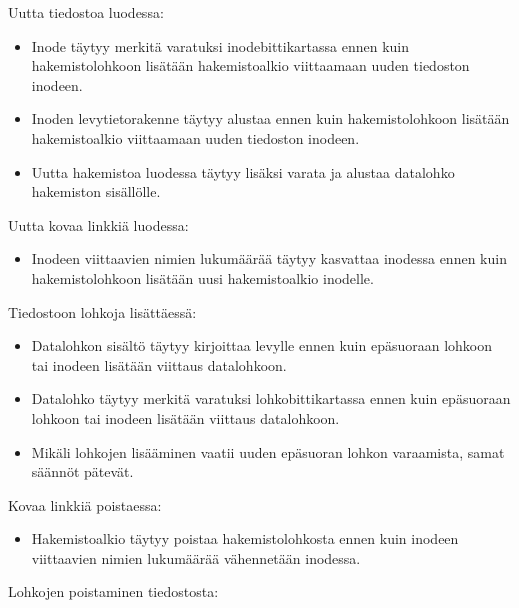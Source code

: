 
Uutta tiedostoa luodessa:
\begin{itemize}
    \item{Inode täytyy merkitä varatuksi inodebittikartassa ennen kuin hakemistolohkoon lisätään hakemistoalkio viittaamaan uuden tiedoston inodeen.}
    \item{Inoden levytietorakenne täytyy alustaa ennen kuin hakemistolohkoon lisätään hakemistoalkio viittaamaan uuden tiedoston inodeen.}
    \item{Uutta hakemistoa luodessa täytyy lisäksi varata ja alustaa datalohko hakemiston sisällölle.}
\end{itemize}
Uutta kovaa linkkiä luodessa:
\begin{itemize}
    \item{Inodeen viittaavien nimien lukumäärää täytyy kasvattaa inodessa ennen kuin hakemistolohkoon lisätään uusi hakemistoalkio inodelle.}
\end{itemize}
Tiedostoon lohkoja lisättäessä:
\begin{itemize}
    \item{Datalohkon sisältö täytyy kirjoittaa levylle ennen kuin epäsuoraan lohkoon tai inodeen lisätään viittaus datalohkoon.}
    \item{Datalohko täytyy merkitä varatuksi lohkobittikartassa ennen kuin epäsuoraan lohkoon tai inodeen lisätään viittaus datalohkoon.}
    \item{Mikäli lohkojen lisääminen vaatii uuden epäsuoran lohkon varaamista, samat säännöt pätevät.}
\end{itemize}
Kovaa linkkiä poistaessa:
\begin{itemize}
    \item{Hakemistoalkio täytyy poistaa hakemistolohkosta ennen kuin inodeen viittaavien nimien lukumäärää vähennetään inodessa.}
\end{itemize}
Lohkojen poistaminen tiedostosta:
